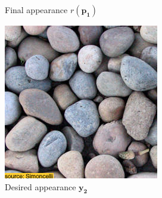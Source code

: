 \begin{figure}[ht]
\begin{subfigure}{\textwidth}
\begin{subfigure}{0.2\textwidth}
            \caption*{Final appearance \(r(\bm{p_1})\)}
            \label{fig:intro_pixels_vs_stats-pixels_proj}
        \end{subfigure}
        
        \begin{subfigure}{0.2\textwidth}
            \centering
            \includegraphics[width=\textwidth]{images/01-pixels_vs_stats-stats_target.jpg}
            \caption*{Desired appearance \(\bm{y_2}\)}
            \vspace*{5mm}
            \label{fig:intro_pixels_vs_stats-stats_target}
        \end{subfigure}
        \hfill
        \begin{subfigure}{0.2\textwidth}
            \centering

\end{subfigure}
\end{subfigure}
\end{figure}
